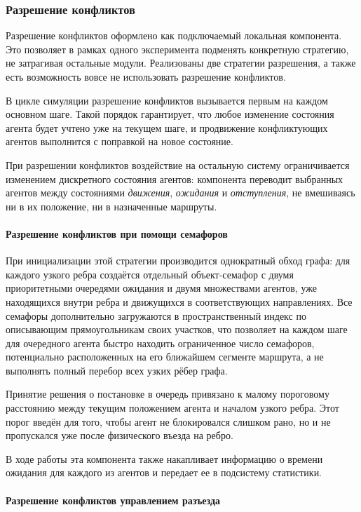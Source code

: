 \subsubsection{Разрешение конфликтов}

Разрешение конфликтов оформлено как подключаемый локальная компонента. 
Это позволяет в рамках одного эксперимента подменять 
конкретную стратегию, не затрагивая остальные модули. Реализованы две стратегии разрешения,
а также есть возможность вовсе не использовать разрешение конфликтов.

В цикле симуляции разрешение конфликтов вызывается первым на каждом основном шаге. 
Такой порядок гарантирует, что любое изменение состояния агента будет учтено уже на текущем шаге, 
и продвижение конфликтующих агентов выполнится с поправкой на новое состояние.

При разрешении конфликтов воздействие на остальную систему ограничивается изменением дискретного
состояния агентов: компонента переводит выбранных агентов между состояниями
\emph{движения}, \emph{ожидания} и \emph{отступления}, не вмешиваясь ни в их положение,
ни в назначенные маршруты.

\paragraph{Разрешение конфликтов при помощи семафоров}

При инициализации этой стратегии производится однократный обход графа: для
каждого узкого ребра создаётся отдельный объект-семафор с двумя приоритетными очередями
ожидания и двумя множествами агентов, уже находящихся
внутри ребра и движущихся в соответствующих направлениях. Все семафоры дополнительно
загружаются в пространственный индекс по описывающим прямоугольникам своих участков,
что позволяет на каждом шаге для очередного агента быстро находить ограниченное число
семафоров, потенциально расположенных на его ближайшем сегменте маршрута, а не выполнять
полный перебор всех узких рёбер графа.

Принятие решения о постановке в очередь привязано к малому пороговому расстоянию между
текущим положением агента и началом узкого ребра. Этот порог введён для того, чтобы
агент не блокировался слишком рано, но и не пропускался уже после физического въезда на ребро.

В ходе работы эта компонента также накапливает информацию о времени ожидания для каждого из агентов
и передает ее в подсистему статистики.

\paragraph{Разрешение конфликтов управлением разъезда}

